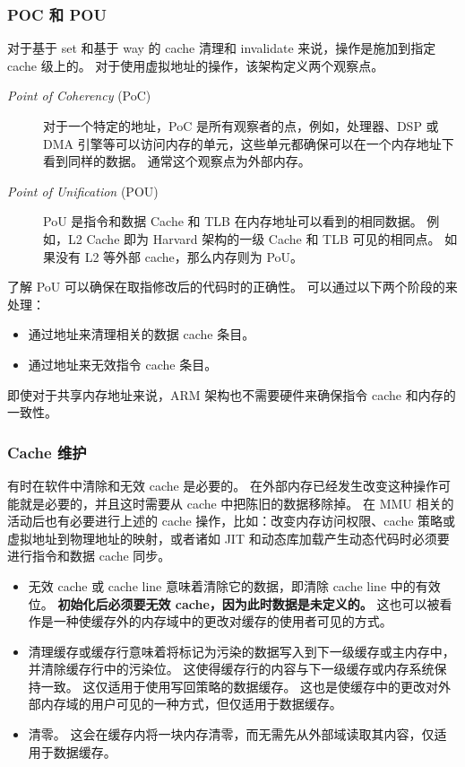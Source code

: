 \subsubsection{POC 和 POU}

对于基于 set 和基于 way 的 cache 清理和 invalidate 来说，操作是施加到指定 cache 级上的。
对于使用虚拟地址的操作，该架构定义两个观察点。

\begin{description}
  \item[\textit{Point of Coherency} (PoC)] 对于一个特定的地址，PoC 是所有观察者的点，例如，处理器、DSP 或 DMA 引擎等可以访问内存的单元，这些单元都确保可以在一个内存地址下看到同样的数据。
    通常这个观察点为外部内存。
  \item[\textit{Point of Unification} (POU)] PoU 是指令和数据 Cache 和 TLB 在内存地址可以看到的相同数据。
    例如，L2 Cache 即为 Harvard 架构的一级 Cache 和 TLB 可见的相同点。
    如果没有 L2 等外部 cache，那么内存则为 PoU。
\end{description}

了解 PoU 可以确保在取指修改后的代码时的正确性。
可以通过以下两个阶段的来处理：

\begin{itemize}
  \item 通过地址来清理相关的数据 cache 条目。
  \item 通过地址来无效指令 cache 条目。
\end{itemize}

即使对于共享内存地址来说，ARM 架构也不需要硬件来确保指令 cache 和内存的一致性。

\subsubsection{Cache 维护}

有时在软件中清除和无效 cache 是必要的。
在外部内存已经发生改变这种操作可能就是必要的，并且这时需要从 cache 中把陈旧的数据移除掉。
在 MMU 相关的活动后也有必要进行上述的 cache 操作，比如：改变内存访问权限、cache 策略或虚拟地址到物理地址的映射，或者诸如 JIT 和动态库加载产生动态代码时必须要进行指令和数据 cache 同步。

\begin{itemize}
  \item 无效 cache 或 cache line 意味着清除它的数据，即清除 cache line 中的有效位。
    \textbf{初始化后必须要无效 cache，因为此时数据是未定义的。}
    这也可以被看作是一种使缓存外的内存域中的更改对缓存的使用者可见的方式。
  \item 清理缓存或缓存行意味着将标记为污染的数据写入到下一级缓存或主内存中，并清除缓存行中的污染位。
    这使得缓存行的内容与下一级缓存或内存系统保持一致。
    这仅适用于使用写回策略的数据缓存。
    这也是使缓存中的更改对外部内存域的用户可见的一种方式，但仅适用于数据缓存。
  \item 清零。
    这会在缓存内将一块内存清零，而无需先从外部域读取其内容，仅适用于数据缓存。
\end{itemize}

